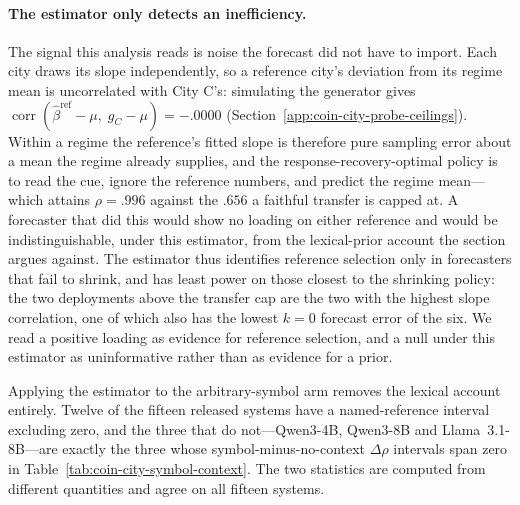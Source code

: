 \paragraph{The estimator only detects an inefficiency.} The signal this analysis
reads is noise the forecast did not have to import. Each city draws its slope
independently, so a reference city's deviation from its regime mean is
uncorrelated with City C's: simulating the generator gives
$\operatorname{corr}(\widehat\beta^{\mathrm{ref}}-\mu,\;g_C-\mu)=-.0000$
(Section~\ref{app:coin-city-probe-ceilings}). Within a regime the reference's
fitted slope is therefore pure sampling error about a mean the regime already
supplies, and the response-recovery-optimal policy is to read the cue, ignore the
reference numbers, and predict the regime mean---which attains $\rho=.996$ against
the $.656$ a faithful transfer is capped at. A forecaster that did this would show
no loading on either reference and would be indistinguishable, under this
estimator, from the lexical-prior account the section argues against. The
estimator thus identifies reference selection only in forecasters that fail to
shrink, and has least power on those closest to the shrinking policy: the two
deployments above the transfer cap are the two with the highest slope
correlation, one of which also has the lowest $k=0$ forecast error of the six. We read a
positive loading as evidence for reference selection, and a null under this
estimator as uninformative rather than as evidence for a prior.

\begin{center}
\begin{minipage}{\linewidth}
\centering
{}
\label{tab:coin-city-reference-selection-symbol}
\small
\setlength{\tabcolsep}{4pt}

\end{minipage}
\end{center}

Applying the estimator to the arbitrary-symbol arm removes the lexical account
entirely. Twelve of the fifteen released systems have a named-reference interval
excluding zero, and the three that do not---Qwen3-4B, Qwen3-8B and
Llama~3.1-8B---are exactly the three whose symbol-minus-no-context $\Delta\rho$
intervals span zero in Table~\ref{tab:coin-city-symbol-context}. The two
statistics are computed from different quantities and agree on all fifteen
systems.

